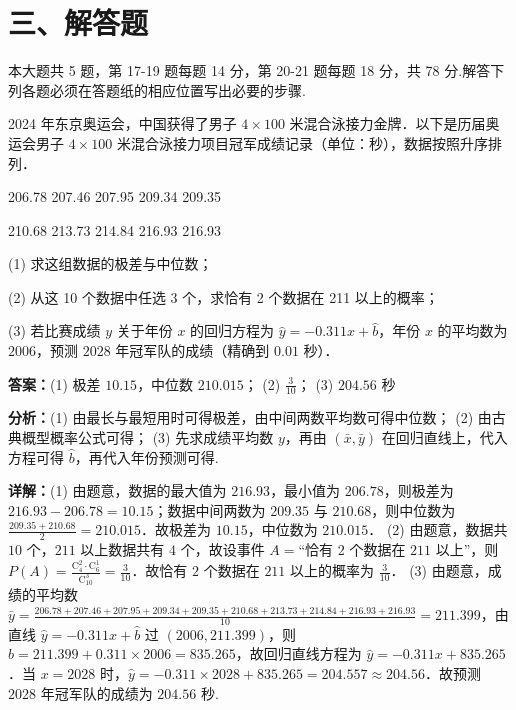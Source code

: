 \section*{三、解答题}
本大题共 5 题，第 17-19 题每题 14 分，第 20-21 题每题 18 分，共 78 分.解答下列各题必须在答题纸的相应位置写出必要的步骤.

\begin{question}[points=14]
2024 年东京奥运会，中国获得了男子 $4 \times 100$ 米混合泳接力金牌．以下是历届奥运会男子 $4 \times 100$ 米混合泳接力项目冠军成绩记录（单位：秒），数据按照升序排列．



206.78  207.46  207.95  209.34  209.35

210.68  213.73  214.84  216.93  216.93



(1) 求这组数据的极差与中位数；

(2) 从这 10 个数据中任选 3 个，求恰有 2 个数据在 211 以上的概率；

(3) 若比赛成绩 $y$ 关于年份 $x$ 的回归方程为 $\hat{y} = -0.311x + \hat{b}$，年份 $x$ 的平均数为 $2006$，预测 $2028$ 年冠军队的成绩（精确到 $0.01$ 秒）．
\begin{solution}
\textbf{答案：}(1) 极差 $10.15$，中位数 $210.015$； (2) $\frac{3}{10}$； (3) $204.56$ 秒

\textbf{分析：}(1) 由最长与最短用时可得极差，由中间两数平均数可得中位数； (2) 由古典概型概率公式可得； (3) 先求成绩平均数 $y$，再由 $(\bar{x}, \bar{y})$ 在回归直线上，代入方程可得 $\hat{b}$，再代入年份预测可得.

\textbf{详解：}(1) 由题意，数据的最大值为 $216.93$，最小值为 $206.78$，则极差为 $216.93 - 206.78 = 10.15$；数据中间两数为 $209.35$ 与 $210.68$，则中位数为 $\frac{209.35 + 210.68}{2} = 210.015$．故极差为 $10.15$，中位数为 $210.015$．
(2) 由题意，数据共 $10$ 个，$211$ 以上数据共有 $4$ 个，故设事件 $A = $“恰有 $2$ 个数据在 $211$ 以上”，则 $P(A) = \frac{\mathrm{C}_4^2 \cdot \mathrm{C}_6^1}{\mathrm{C}_{10}^3} = \frac{3}{10}$．故恰有 $2$ 个数据在 $211$ 以上的概率为 $\frac{3}{10}$．
(3) 由题意，成绩的平均数 $\bar{y} = \frac{206.78 + 207.46 + 207.95 + 209.34 + 209.35 + 210.68 + 213.73 + 214.84 + 216.93 + 216.93}{10} = 211.399$，由直线 $\hat{y} = -0.311x + \hat{b}$ 过 $(2006, 211.399)$，则 $\hat{b} = 211.399 + 0.311 \times 2006 = 835.265$，故回归直线方程为 $\hat{y} = -0.311x + 835.265$．当 $x = 2028$ 时，$\hat{y} = -0.311 \times 2028 + 835.265 = 204.557 \approx 204.56$．故预测 $2028$ 年冠军队的成绩为 $204.56$ 秒.
\end{solution}
\end{question}

